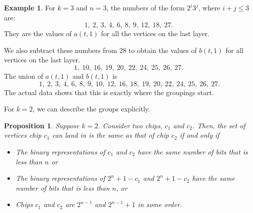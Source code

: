 \documentclass[11pt]{article}
\newtheorem{proposition}[theorem]{Proposition}
\theoremstyle{definition}
\newtheorem{example}{Example}
\theoremstyle{remark}
\begin{document}
\begin{example}
    For $k=3$ and $n=3$, the numbers of the form $2^i3^j$, where $i+j \leq 3$ are:
\[1,\ 2,\ 3,\ 4,\ 6,\ 8,\ 9,\ 12,\ 18,\ 27.\]
They are the values of $a(t,1)$ for all the vertices on the last layer.

We also subtract these numbers from 28 to obtain the values of $b(t,1)$ for all vertices on the last layer.
\[1,\ 10,\ 16,\ 19,\ 20,\ 22,\ 24,\ 25,\ 26,\ 27.\]
The union of $a(t,1)$ and $b(t,1)$ is
\[\ 1,\ 2,\ 3,\ 4,\ 6,\ 8, \ 9, \ 10,\ 12,\ 16,\ 18,\ 19,\ 20,\ 22,\ 24,\ 25,\ 26, \ 27.\]
The actual data shows that this is exactly where the groupings start.
\end{example}

For $k=2$, we can describe the groups explicitly. 

\begin{proposition}
    Suppose $k=2$. Consider two chips, $c_1$ and $c_2$. Then, the set of vertices chip $c_1$ can land in is the same as that of chip $c_2$ if and only if
    \begin{itemize}
        \item The binary representations of $c_1$ and $c_2$ have the same number of bits that is less than $n$ or
        \item The binary representations of $2^n +1 - c_1$ and $2^n +1- c_2$ have the same number of bits that is less than $n$, or
        \item Chips $c_1$ and $c_2$ are $2^{n-1}$ and $2^{n-1}+1$ in some order.
        \end{itemize}
\end{proposition}
\end{document}
